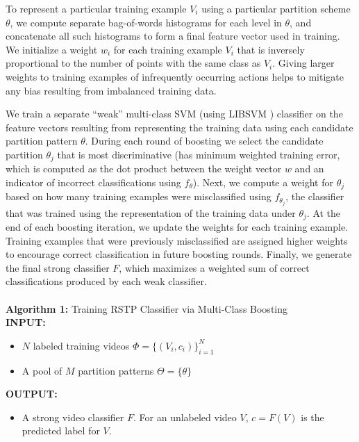 \documentclass{bmvc2k}
\begin{document}
  To represent a particular training example $V_i$ using a particular
  partition scheme $\theta$, we compute separate bag-of-words histograms for
  each level in $\theta$, and concatenate all such histograms to form a
  final feature vector used in training.
  We initialize a weight
  $w_i$ for each
	training example $V_i$ that is inversely proportional to the number of points
	with the same class as $V_i$. Giving larger weights to training examples of
  infrequently occurring actions helps to mitigate any bias resulting from imbalanced
  training data.
  
  We train a separate ``weak''
  multi-class SVM 
  (using LIBSVM \cite{Chang11})
	classifier on the feature vectors resulting from representing the training
	data using each candidate partition pattern $\theta$.   During each round of boosting we select the
	candidate partition $\theta_j$ that is most discriminative (has minimum
  weighted training
	error, which is computed as the dot product between the weight vector $w$
  and an indicator of incorrect classifications using $f_\theta$).
  Next, we compute a weight for $\theta_j$ based on how many training
  examples were misclassified using $f_{\theta_j}$, the classifier
  that was trained using the representation of the training data under
  $\theta_j$.
  At the end of each boosting iteration, we update the weights for each
  training example. Training examples that were previously misclassified are
  assigned higher weights to encourage correct classification in future
  boosting rounds.
  Finally, we generate the 
	final strong classifier $F$, which maximizes a weighted
  sum of correct classifications produced by each weak classifier.\\
  \\
	\noindent\textbf{Algorithm 1:} Training RSTP Classifier via Multi-Class Boosting \\
	\textbf{INPUT:} 
	\begin{itemize}
		\item $N$ labeled training videos $\Phi = \{(V_i, c_i)\}_{i=1}^N$
		\item A pool of $M$ partition patterns $\Theta = \{\theta\}$
	\end{itemize}
	\textbf{OUTPUT:}
	\begin{itemize}
		\item A strong video classifier $F$. For an unlabeled video $V$, 
			$c=F(V)$ is the predicted label for $V$.
	\end{itemize}
\end{document}
